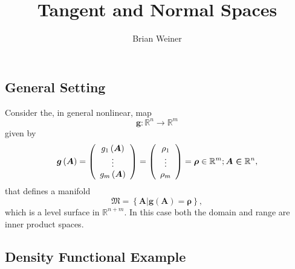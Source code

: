 \documentclass[aps,preprint]{revtex4}%
\begin{document}
\preprint{ }
\title[Short title for running header]{Tangent and Normal Spaces}
\author{Brian Weiner}
\maketitle
\tableofcontents


\subsection{General Setting}

Consider the, in general nonlinear, map
\begin{equation}
\boldsymbol{g}:\mathbb{R}^{n}\longrightarrow\mathbb{R}^{m}%
\end{equation}
given by%
\begin{equation}
\boldsymbol{g}\left(  \boldsymbol{A}\right)  =\left(
\begin{array}
[c]{c}%
g_{1}\left(  \boldsymbol{A}\right) \\
\vdots\\
g_{m}\left(  \boldsymbol{A}\right)
\end{array}
\right)  =\left(
\begin{array}
[c]{c}%
\rho_{1}\\
\vdots\\
\rho_{m}%
\end{array}
\right)  =\boldsymbol{\rho}\in\mathbb{R}^{m};\boldsymbol{A\in}\mathbb{R}^{n},
\end{equation}
that defines a manifold
\begin{equation}
\mathfrak{M}=\left\{  \left.  \boldsymbol{A}\right\vert \boldsymbol{g}\left(
\boldsymbol{A}\right)  =\boldsymbol{\rho}\right\}  ,
\end{equation}
which is a level surface in $\mathbb{R}^{n+m}.$ In this case both the domain
and range are inner product spaces.

\subsection{Density Functional Example}
\end{document}
